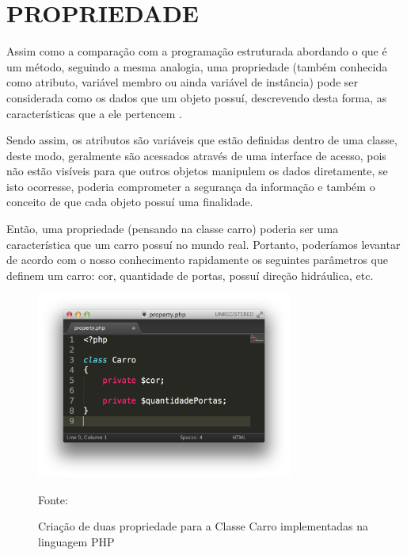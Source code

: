 \section{PROPRIEDADE}
Assim como a comparação com a programação estruturada abordando o que é um 
método, seguindo a mesma analogia, uma propriedade (também conhecida como 
atributo, variável membro ou ainda variável de instância) pode ser considerada 
como os dados que um objeto possuí, descrevendo desta forma, as características 
que a ele pertencem \cite{programmingPhp}.

Sendo assim, os atributos são variáveis que estão definidas dentro de uma
classe, deste modo, geralmente são acessados através de uma interface de acesso,
pois não estão visíveis para que outros objetos manipulem os dados diretamente, 
se isto ocorresse, poderia comprometer a segurança da informação e também o 
conceito de que cada objeto possuí uma finalidade.

Então, uma propriedade (pensando na classe carro) poderia ser uma característica
que um carro possuí no mundo real. Portanto, poderíamos levantar de acordo com 
o nosso conhecimento rapidamente os seguintes parâmetros que definem um carro: 
cor, quantidade de portas, possuí direção hidráulica, etc.


\begin{figure}[h!tb]
	\label{fig:propriedade}
	
	\centering
	\caption{Criação de duas propriedade para a Classe Carro implementadas na
	linguagem PHP}
	
	\centering
	\includegraphics[width=0.75\textwidth]{images/property.png}
	
	\centering
	\footnotesize Fonte: \fonteOAutor
\end{figure}

\FloatBarrier 	%

